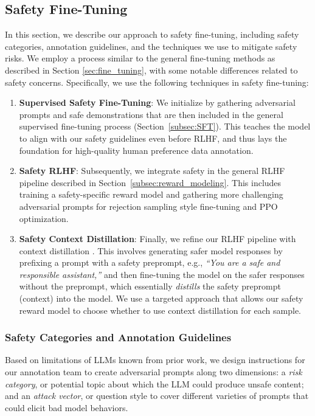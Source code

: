 \subsection{Safety Fine-Tuning}
\label{sec:safety_alignment}

In this section, we describe our approach to safety fine-tuning, including safety categories, annotation guidelines, and the techniques we use to mitigate safety risks. We employ a process similar to the general fine-tuning methods as described in Section \ref{sec:fine_tuning}, with some notable differences related to safety concerns. Specifically, we use the following techniques in safety fine-tuning:

\begin{enumerate}
    \item \textbf{Supervised Safety Fine-Tuning}: We initialize by gathering adversarial prompts and safe demonstrations that are then included in the general supervised fine-tuning process (Section~\ref{subsec:SFT}). This teaches the model to align with our safety guidelines even before RLHF, and thus lays the foundation for high-quality human preference data annotation.
    \item \textbf{Safety RLHF}: Subsequently, we integrate safety in the general RLHF pipeline described in Section~\ref{subsec:reward_modeling}. This includes training a safety-specific reward model and gathering more challenging adversarial prompts for rejection sampling style fine-tuning and PPO optimization.
    \item \textbf{Safety Context Distillation}: Finally, we refine our RLHF pipeline with context distillation \citep{askell2021general}. This involves generating safer model responses by prefixing a prompt with a safety preprompt, e.g., \textit{``You are a safe and responsible assistant,''} and then fine-tuning the model on the safer responses without the preprompt, which essentially \textit{distills} the safety preprompt (context) into the model. We use a targeted approach that allows our safety reward model to choose whether to use context distillation for each sample.
\end{enumerate}

\subsubsection{Safety Categories and Annotation Guidelines} \label{sec:safety_guidelines}

Based on limitations of LLMs known from prior work, we design instructions for our annotation team to create adversarial prompts along two dimensions: a \textit{risk category}, or potential topic about which the LLM could produce unsafe content; and an \textit{attack vector}, or question style to cover different varieties of prompts that could elicit bad model behaviors. 

